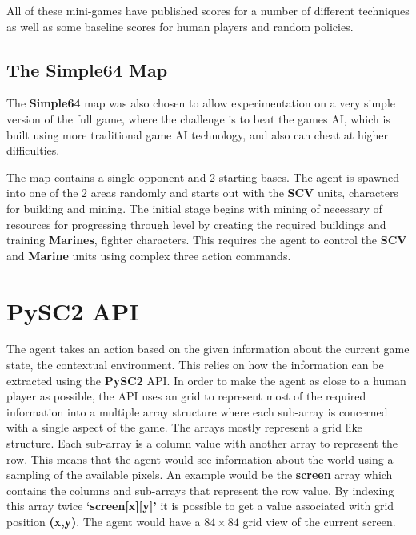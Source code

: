 All of these mini-games have published scores for a number of different
techniques as well as some baseline scores for human players and random
policies.

\subsection{The \textbf{Simple64} Map}

The \textbf{Simple64} map was also chosen to allow experimentation on
a very simple version of the full game, where the challenge is
to beat the games AI, which is built using more traditional game AI
technology, and also can cheat at higher difficulties.

The map contains a single opponent and 2 starting bases. The agent is spawned
into one of the 2 areas randomly and starts out with the \textbf{SCV} units,
characters for building and mining. The initial stage begins with mining of
necessary of resources for progressing through level by creating the required
buildings and training \textbf{Marines}, fighter characters. This requires the
agent to control the \textbf{SCV} and \textbf{Marine} units using complex three
action commands.

\section{PySC2 API}


The agent takes an action based on the given information about the current game
state, the contextual environment. This relies on how the information can be
extracted using the \textbf{PySC2} API\@. In order to make the agent as close
to a human player as possible, the API uses an grid to represent most of the
required information into a multiple array structure where each sub-array is
concerned with a single aspect of the game. The arrays mostly represent a grid
like structure. Each sub-array is a column value with another array to represent
the row. This means that the agent would see information about the world using a
sampling of the available pixels. An example would be the \textbf{screen} array
which contains the columns and sub-arrays that represent the row value. By
indexing this array twice \textbf{`screen[x][y]'} it is possible to get a value
associated with grid position \textbf{(x,y)}. The agent would have a $84 \times
84$ grid view of the current screen.

